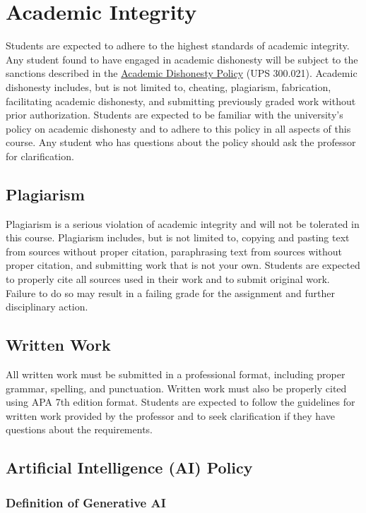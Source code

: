 \documentclass[12pt]{article}     %
\begin{document}
\section{Academic Integrity}
Students are expected to adhere to the highest standards of academic integrity. Any student found to have engaged in academic dishonesty will be subject to the sanctions described in the \href{https://www.fullerton.edu/senate/publications_policies_resolutions/ups/UPS%20300/UPS%20300.021.pdf}{Academic Dishonesty Policy} (UPS 300.021). Academic dishonesty includes, but is not limited to, cheating, plagiarism, fabrication, facilitating academic dishonesty, and submitting previously graded work without prior authorization. Students are expected to be familiar with the university's policy on academic dishonesty and to adhere to this policy in all aspects of this course. Any student who has questions about the policy should ask the professor for clarification.

\subsection*{Plagiarism}
Plagiarism is a serious violation of academic integrity and will not be tolerated in this course. Plagiarism includes, but is not limited to, copying and pasting text from sources without proper citation, paraphrasing text from sources without proper citation, and submitting work that is not your own. Students are expected to properly cite all sources used in their work and to submit original work. Failure to do so may result in a failing grade for the assignment and further disciplinary action.

\subsection*{Written Work}
All written work must be submitted in a professional format, including proper grammar, spelling, and punctuation. Written work must also be properly cited using APA 7th edition format. Students are expected to follow the guidelines for written work provided by the professor and to seek clarification if they have questions about the requirements.

\subsection*{Artificial Intelligence (AI) Policy}

\subsubsection*{Definition of Generative AI}
\end{document}
